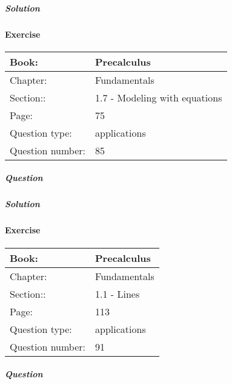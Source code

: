 \documentclass{article}
\begin{document}
            \subparagraph{Solution}
            
            
            \newpage
            \paragraph{Exercise}\par
            \noindent
            \begin{tabularx}{1\textwidth}{
                    p{}
                    p{}
                }
                \toprule
                Book: & Precalculus
                \\
                \midrule
                Chapter: & Fundamentals
                \\
                \midrule
                Section:: & 1.7 - Modeling with equations
                \\
                \midrule
                Page: & 75
                \\
                \midrule
                Question type: & applications
                \\
                \midrule
                Question number: & 85
                \\
                \bottomrule
            \end{tabularx}
            \subparagraph{Question}
            
            \subparagraph{Solution}
            
            
            \newpage
            \paragraph{Exercise}\par
            \noindent
            \begin{tabularx}{1\textwidth}{
                    p{}
                    p{}
                }
                \toprule
                Book: & Precalculus
                \\
                \midrule
                Chapter: & Fundamentals
                \\
                \midrule
                Section:: & 1.1 - Lines
                \\
                \midrule
                Page: & 113
                \\
                \midrule
                Question type: & applications
                \\
                \midrule
                Question number: & 91
                \\
                \bottomrule
            \end{tabularx}
            \subparagraph{Question}
            
\end{document}
